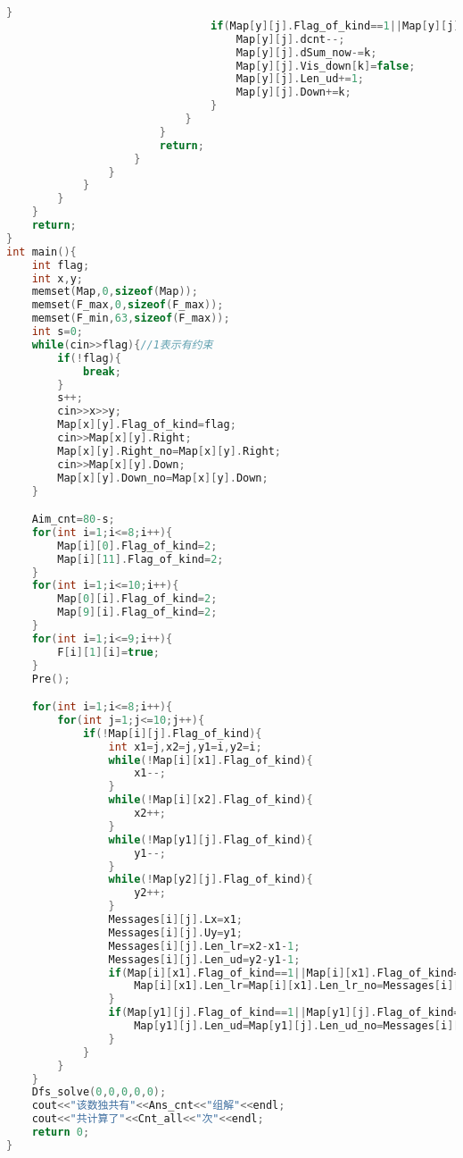 \begin{lstlisting}[language=C++, firstnumber=1, basicstyle=\tiny]
                                }
                                if(Map[y][j].Flag_of_kind==1||Map[y][j].Flag_of_kind==4){//4表示只有下
                                    Map[y][j].dcnt--;
                                    Map[y][j].dSum_now-=k;
                                    Map[y][j].Vis_down[k]=false;
                                    Map[y][j].Len_ud+=1;
                                    Map[y][j].Down+=k;
                                }
                            }
                        }
                        return;
                    }
                }
            }
        }
    }
    return;
}
int main(){
    int flag;
    int x,y;
    memset(Map,0,sizeof(Map));
    memset(F_max,0,sizeof(F_max));
    memset(F_min,63,sizeof(F_max));
    int s=0;
    while(cin>>flag){//1表示有约束
        if(!flag){
            break;
        }
        s++;
        cin>>x>>y;
        Map[x][y].Flag_of_kind=flag;
        cin>>Map[x][y].Right;
        Map[x][y].Right_no=Map[x][y].Right;
        cin>>Map[x][y].Down;
        Map[x][y].Down_no=Map[x][y].Down;
    }

    Aim_cnt=80-s;
    for(int i=1;i<=8;i++){
        Map[i][0].Flag_of_kind=2;
        Map[i][11].Flag_of_kind=2;
    }
    for(int i=1;i<=10;i++){
        Map[0][i].Flag_of_kind=2;
        Map[9][i].Flag_of_kind=2;
    }
    for(int i=1;i<=9;i++){
        F[i][1][i]=true;
    }
    Pre();

    for(int i=1;i<=8;i++){
        for(int j=1;j<=10;j++){
            if(!Map[i][j].Flag_of_kind){
                int x1=j,x2=j,y1=i,y2=i;
                while(!Map[i][x1].Flag_of_kind){
                    x1--;
                }
                while(!Map[i][x2].Flag_of_kind){
                    x2++;
                }
                while(!Map[y1][j].Flag_of_kind){
                    y1--;
                }
                while(!Map[y2][j].Flag_of_kind){
                    y2++;
                }
                Messages[i][j].Lx=x1;
                Messages[i][j].Uy=y1;
                Messages[i][j].Len_lr=x2-x1-1;
                Messages[i][j].Len_ud=y2-y1-1;
                if(Map[i][x1].Flag_of_kind==1||Map[i][x1].Flag_of_kind==3){
                    Map[i][x1].Len_lr=Map[i][x1].Len_lr_no=Messages[i][j].Len_lr;
                }
                if(Map[y1][j].Flag_of_kind==1||Map[y1][j].Flag_of_kind==4){
                    Map[y1][j].Len_ud=Map[y1][j].Len_ud_no=Messages[i][j].Len_ud;
                }
            }
        }
    }
	Dfs_solve(0,0,0,0,0);
    cout<<"该数独共有"<<Ans_cnt<<"组解"<<endl;
    cout<<"共计算了"<<Cnt_all<<"次"<<endl;
    return 0;
}
\end{lstlisting}
